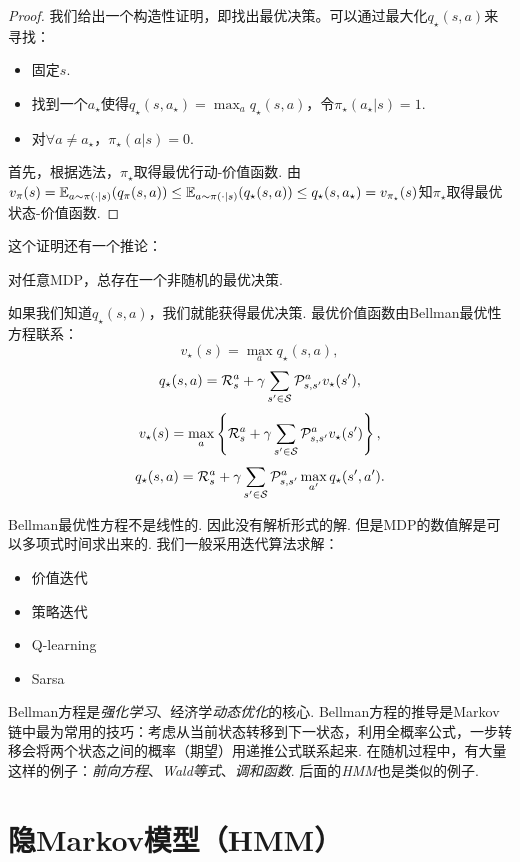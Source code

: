 \begin{proof}
我们给出一个构造性证明，即找出最优决策。可以通过最大化$q_\star(s,a)$来寻找：
    \begin{itemize}
        \item 固定$s$.
        \item 找到一个$a_\star$使得$q_\star(s,a_\star)=\max_{a}q_\star(s,a)$，令$\pi_\star(a_\star|s)=1$.
        \item 对$\forall a\neq a_\star$，$\pi_\star(a|s)=0$.
    \end{itemize}
首先，根据选法，$\pi_\star$取得最优行动-价值函数. 由$v_\pi(s) = \mathbb{E}_{a\sim\pi(\cdot|s)}(q_\pi(s,a))\leq \mathbb{E}_{a\sim\pi(\cdot|s)}(q_\star(s,a))\leq q_\star(s,a_\star)=v_{\pi_\star}(s)$知$\pi_\star$取得最优状态-价值函数.
\end{proof}
这个证明还有一个推论：
\begin{corollary}
    对任意MDP，总存在一个非随机的最优决策.    
\end{corollary}

 如果我们知道$q_\star(s,a)$，我们就能获得最优决策. 最优价值函数由Bellman最优性方程联系：
\[v_\star(s) = \max_a q_\star(s,a),\]
\[q_\star(s,a) = \mathcal R_s^a + \gamma \sum_{s'\in \mathcal S}\mathcal P_{s,s'}^av_\star(s'),\]
\[v_\star(s) = \max_a\left\{\mathcal R_s^a + \gamma \sum_{s'\in \mathcal S}\mathcal P_{s,s'}^av_\star(s')\right\},\]
\[q_\star(s,a) = \mathcal R_s^a+\gamma \sum_{s'\in \mathcal S}\mathcal P_{s,s'}^a\max_{a'}q_\star(s',a').\]

Bellman最优性方程不是线性的. 因此没有解析形式的解. 但是MDP的数值解是可以多项式时间求出来的. 我们一般采用迭代算法求解：
\begin{itemize}
    \item 价值迭代
    \item 策略迭代
    \item Q-learning
    \item Sarsa
\end{itemize}


Bellman方程是\emph{强化学习}、经济学\emph{动态优化}的核心. Bellman方程的推导是Markov链中最为常用的技巧：考虑从当前状态转移到下一状态，利用全概率公式，一步转移会将两个状态之间的概率（期望）用递推公式联系起来. 在随机过程中，有大量这样的例子：\emph{前向方程}、\emph{Wald等式}、\emph{调和函数}. 后面的\emph{HMM}也是类似的例子.


\section{隐Markov模型（HMM）}


